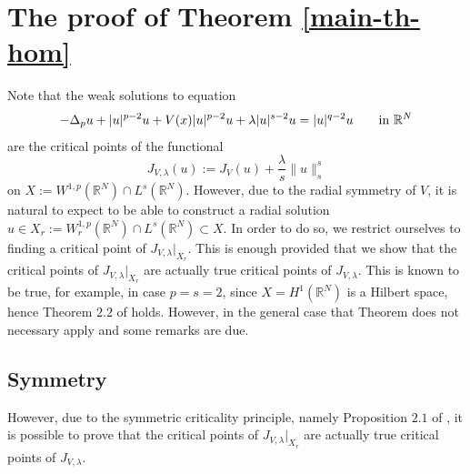 \documentclass[11pt,reqno]{amsart}
\theoremstyle{definition}
\numberwithin{equation}{section}
\numberwithin{theorem}{section}
\numberwithin{equation}{section}
\numberwithin{theorem}{section}
\newcommand{\R}{\mathbb{R}}
\begin{document}
\section{The proof of Theorem \ref{main-th-hom}}\label{sec-proof}
Note that the weak solutions to equation
\begin{equation}\notag
-\Delta_p u+|u|^{p-2}u+V(x)|u|^{p-2}u+\lambda |u|^{s-2}u=|u|^{q-2}u\qquad\text{in $\R^N$}    
\end{equation}
are the critical points of the functional
$$J_{V,\lambda}(u):=J_V(u)+\frac{\lambda}{s}\|u\|^s_s$$
on $X:=W^{1,p}(\R^N)\cap L^s(\R^N)$. However, due to the radial symmetry of $V$, it is natural to expect to be able to construct a radial solution $u\in X_r:=W^{1,p}_r(\R^N)\cap L^s(\R^N)\subset X $. In order to do so, we restrict ourselves to finding a critical point of $J_{V,\lambda}|_{X_r}$. This is enough provided that we show that the critical points of $J_{V,\lambda}|_{X_r}$ are actually true critical points of $J_{V,\lambda}$. This is known to be true, for example, in case $p=s=2$, since $X=H^1(\R^N)$ is a Hilbert space, hence Theorem $2.2$ of \cite{kobayashi2004principle} holds. However, in the general case that Theorem does not necessary apply and some remarks are due.


\subsection{Symmetry}
However, due to the symmetric criticality principle, namely Proposition $2.1$ of \cite{kobayashi2004principle}, it is possible to prove that the critical points of $J_{V,\lambda}|_{X_r}$ are actually true critical points of $J_{V,\lambda}$. \\
\end{document}
